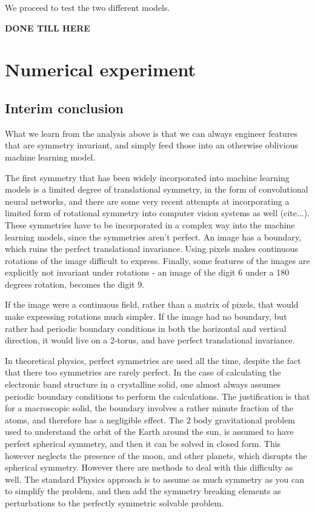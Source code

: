 \documentclass[twocolumn, prl]{revtex4-1}
\begin{document}
We proceed to test the two different models.


{\bf DONE TILL HERE}

\section{Numerical experiment}
\label{Sec:empirics}


\subsection{Interim conclusion}

What we learn from the analysis above is that we can always engineer features that are symmetry invariant, and simply feed those into an otherwise oblivious machine learning model.



The first symmetry that has been widely incorporated into machine learning models is a limited degree of translational symmetry, in the form of convolutional neural networks, and there are some very recent attempts at incorporating a limited form of rotational symmetry into computer vision systems as well (cite...). These symmetries have to be incorporated in a complex way into the machine learning models, since the symmetries aren't perfect. An image has a boundary, which ruins the perfect translational invariance. Using pixels makes continuous rotations of the image difficult to express. Finally, some features of the images are explicitly not invariant under rotations - an image of the digit 6 under a 180 degrees rotation, becomes the digit 9.

If the image were a continuous field, rather than a matrix of pixels, that would make expressing rotations much simpler. If the image had no boundary, but rather had periodic boundary conditions in both the horizontal and vertical direction, it would live on a 2-torus, and have perfect translational invariance.

In theoretical physics, perfect symmetries are used all the time, despite the fact that there too symmetries are rarely perfect. In the case of calculating the electronic band structure in a crystalline solid, one almost always assumes periodic boundary conditions to perform the calculations. The justification is that for a macroscopic solid, the boundary involves a rather minute fraction of the atoms, and therefore has a negligible effect. 
The 2 body gravitational problem used to understand the orbit of the Earth around the sun, is assumed to have perfect spherical symmetry, and then it can be solved in closed form. This however neglects the presence of the moon, and other planets, which disrupts the spherical symmetry. However there are methods to deal with this difficulty as well. The standard Physics approach is to assume as much symmetry as you can to simplify the problem, and then add the symmetry breaking elements as perturbations to the perfectly symmetric solvable problem. 
\end{document}

